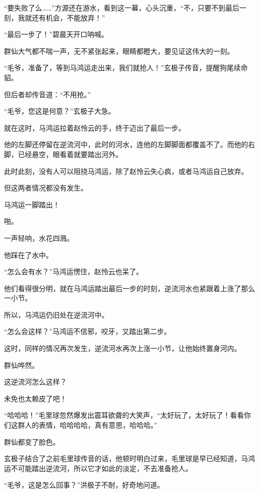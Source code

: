 
\begin{this_body}

“要失败了么……”方源还在游水，看到这一幕，心头沉重，“不，只要不到最后一刻，我就还有机会，不能放弃！”

“最后一步了！”碧晨天开口呐喊。

群仙大气都不喘一声，无不紧张起来，眼睛都瞪大，要见证这伟大的一刻。

“毛爷，准备了，等到马鸿运走出来，我们就抢人！”玄极子传音，提醒狗尾续命貂。

但后者却传音道：“不用抢。”

“毛爷，您这是何意？”玄极子大急。

就在这时，马鸿运拉着赵怜云的手，终于迈出了最后一步。

他的左脚还停留在逆流河中，此时的河水，连他的左脚脚面都覆盖不了。而他的右脚，已经悬空，眼看着就要踏出河外。

此时此刻，没有人可以阻挠马鸿运，除了赵怜云失心疯，或者马鸿运自己放弃。

但这两者情况都没有发生。

马鸿运一脚踏出！

啪。

一声轻响，水花四溅。

他踩在了水中。

“怎么会有水？”马鸿运愣住，赵怜云也呆了。

他们看得很分明，就在马鸿运踏出最后一步的时刻，逆流河水也紧跟着上涨了那么一小节。

所以，马鸿运仍旧处在逆流河中。

“怎么会这样？”马鸿运不信邪，咬牙，又踏出第二步。

这时，同样的情况再次发生，逆流河水再次上涨一小节，让他始终置身河内。

群仙哗然。

这逆流河怎么这样？

未免也太赖皮了吧！

“哈哈哈！”毛里球忽然爆发出震耳欲聋的大笑声，“太好玩了，太好玩了！看看你们这群人的表情，哈哈哈哈，真有意思，哈哈哈。”

群仙都变了脸色。

玄极子结合了之前毛里球传音的话，他顿时明白过来，毛里球是早已经知道，马鸿运不可能踏出逆流河，所以它才如此的淡定，不去准备抢人。

“毛爷，这是怎么回事？”洪极子不耐，好奇地问道。


\end{this_body}
